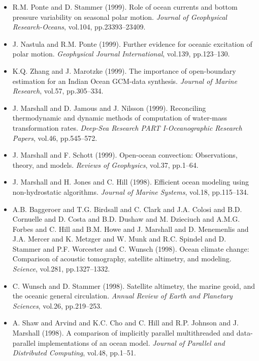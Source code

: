 \begin{itemize}
\item R.M. Ponte and D. Stammer (1999). Role of ocean currents and bottom
pressure variability on seasonal polar motion. {\it Journal of Geophysical
Research-Oceans}, vol.104, pp.23393--23409. 

\item J. Nastula and R.M. Ponte (1999). Further evidence for oceanic
excitation of polar motion. {\it Geophysical Journal International}, vol.139,
pp.123--130. 

\item K.Q. Zhang and J. Marotzke (1999). The importance of open-boundary
estimation for an Indian Ocean GCM-data synthesis. {\it Journal of Marine
Research}, vol.57, pp.305--334. 

\item J. Marshall and D. Jamous and J. Nilsson (1999). Reconciling
thermodynamic and dynamic methods of computation of water-mass
transformation rates. {\it Deep-Sea Research PART I-Oceanographic Research
Papers}, vol.46, pp.545--572. 

\item J. Marshall and F. Schott (1999). Open-ocean convection:
Observations, theory, and models. {\it Reviews of Geophysics}, vol.37,
pp.1--64. 

\item J. Marshall and H. Jones and C. Hill (1998). Efficient ocean
modeling using non-hydrostatic algorithms. {\it Journal of Marine Systems},
vol.18, pp.115--134. 

\item A.B. Baggeroer and T.G. Birdsall and C. Clark and J.A. Colosi and
B.D. Cornuelle and D. Costa and B.D. Dushaw and M. Dzieciuch and A.M.G.
Forbes and C. Hill and B.M. Howe and J. Marshall and D. Menemenlis and
J.A. Mercer and K. Metzger and W. Munk and R.C. Spindel and D. Stammer
and P.F. Worcester and C. Wunsch (1998). Ocean climate change:
Comparison of acoustic tomography, satellite altimetry, and modeling.
{\it Science}, vol.281, pp.1327--1332. 

\item C. Wunsch and D. Stammer (1998). Satellite altimetry, the marine
geoid, and the oceanic general circulation. {\it Annual Review of Earth and
Planetary Sciences}, vol.26, pp.219--253. 

\item A. Shaw and Arvind and K.C. Cho and C. Hill and R.P. Johnson and J.
Marshall (1998). A comparison of implicitly parallel multithreaded and
data-parallel implementations of an ocean model. {\it Journal of Parallel and
Distributed Computing}, vol.48, pp.1--51. 


\end{itemize}
